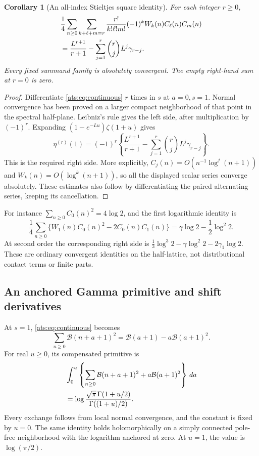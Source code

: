 \documentclass[11pt,a4paper]{article}
\numberwithin{equation}{section}
\newtheorem{corollary}[theorem]{Corollary}
\theoremstyle{definition}
\theoremstyle{remark}
\begin{document}
\begin{corollary}[An all-index Stieltjes square identity]
\label{ats:cor:stieltjes}
For each integer $r\ge0$,
\begin{align}\label{ats:eq:stieltjes}
 &\frac14\sum_{n\ge0}
  \sum_{k+\ell+m=r}\frac{r!}{k!\ell!m!}
                 (-1)^k W_k(n)C_\ell(n)C_m(n)\notag\\
 &=\frac{L^{r+1}}{r+1}
          -\sum_{j=1}^{r}\binom rj L^j\gamma_{r-j}.
\end{align}
Every fixed summand family is absolutely convergent. The empty
right-hand sum at $r=0$ is zero.
\end{corollary}

\begin{proof}
Differentiate \eqref{ats:eq:continuous} $r$ times in $s$ at $a=0,s=1$.
Normal convergence has been proved on a larger compact neighborhood
of that point in the spectral half-plane. Leibniz's rule gives the
left side, after multiplication by $(-1)^r$.
Expanding $(1-e^{-Lu})\zeta(1+u)$ gives
\[
 \eta^{(r)}(1)=(-1)^r\left\{
  \frac{L^{r+1}}{r+1}
   -\sum_{j=1}^{r}\binom rj L^j\gamma_{r-j}\right\}.
\]
This is the required right side. More explicitly,
$C_j(n)=O(n^{-1}\log^j(n+1))$ and
$W_k(n)=O(\log^k(n+1))$, so all the displayed scalar series
converge absolutely. These estimates also follow by differentiating
the paired alternating series, keeping its cancellation.
\end{proof}

For instance $\sum_{n\ge0}C_0(n)^2=4\log2$, and the first
logarithmic identity is
\[
 \frac14\sum_{n\ge0}
  \{W_1(n)C_0(n)^2-2C_0(n)C_1(n)\}
 =\gamma\log2-\frac12\log^2 2.
\]
At second order the corresponding right side is
$\tfrac13\log^3 2-\gamma\log^2 2-2\gamma_1\log2$.
These are ordinary convergent identities on the half-lattice, not
distributional contact terms or finite parts.

\subsection{An anchored Gamma primitive and shift derivatives}

At $s=1$, \eqref{ats:eq:continuous} becomes
\begin{equation}\label{ats:eq:nielsen-square}
 \sum_{n\ge0}\mathcal B(n+a+1)^2
       =\mathcal B(a+1)-a\mathcal B(a+1)^2.
\end{equation}
For real $u\ge0$, its compensated primitive is
\begin{align}\label{ats:eq:gamma-primitive}
 &\int_0^u\left\{\sum_{n\ge0}\mathcal B(n+a+1)^2
                   +a\mathcal B(a+1)^2\right\}\,da\notag\\
 &=\log\frac{\sqrt\pi\,\Gamma(1+u/2)}{\Gamma((1+u)/2)}.
\end{align}
Every exchange follows from local normal convergence, and the
constant is fixed by $u=0$. The same identity holds holomorphically
on a simply connected pole-free neighborhood with the logarithm
anchored at zero. At $u=1$, the value is $\log(\pi/2)$.
\end{document}
